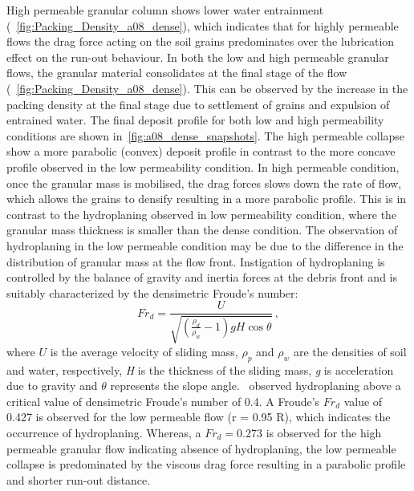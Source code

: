 High permeable granular column shows 
lower water entrainment (~\cref{fig:Packing_Density_a08_dense}), which 
indicates that for highly permeable flows the 
drag force acting on the soil grains predominates over the lubrication effect 
on the run-out behaviour. In both the low and high permeable granular flows, 
the granular material consolidates at the final stage of the flow 
(~\cref{fig:Packing_Density_a08_dense}). This can be observed by the increase 
in the packing density at the final stage due to settlement of grains and 
expulsion of 
entrained water. The final deposit profile for both low and high permeability 
conditions are shown in~\cref{fig:a08_dense_snapshots}. The high permeable 
collapse show a more parabolic (convex) deposit profile in contrast to the more 
concave profile observed in the low permeability condition. In high permeable 
condition, once the granular mass is mobilised, the drag forces slows down the 
rate of flow, which allows the grains to densify resulting in a more parabolic 
profile. This is in contrast to the hydroplaning observed in low permeability 
condition, where the granular mass thickness is smaller than the dense 
condition. The observation of hydroplaning in the low permeable condition may 
be due to the difference in the distribution of granular mass at the flow 
front. Instigation of hydroplaning is controlled by the balance of gravity and 
inertia forces at the debris front and is suitably characterized by the 
densimetric Froude's number:
%
\begin{equation}
Fr_d = \frac{U}{\sqrt{(\frac{\rho_d}{\rho_w}-1)gH\cos\theta}} \,,
\end{equation}
where $U$ is the average velocity of sliding mass, $\rho_p$ and $\rho_w$ are 
the densities of soil and water, respectively, \textit{H} is the thickness of 
the sliding mass, \textit{g} is acceleration due to gravity and $\theta$ 
represents the slope angle.~\citet{Harbitz2003} observed 
hydroplaning above a critical value of densimetric Froude's number of 0.4. A 
Froude's $Fr_d$ value of 0.427 is observed for the low permeable flow (r = 0.95 
R), which indicates the occurrence of hydroplaning. Whereas, a $Fr_d = 0.273$ 
is observed for the high permeable granular flow indicating absence of 
hydroplaning, the low 
permeable collapse is predominated by the viscous drag force resulting in a 
parabolic profile and shorter run-out distance. 
